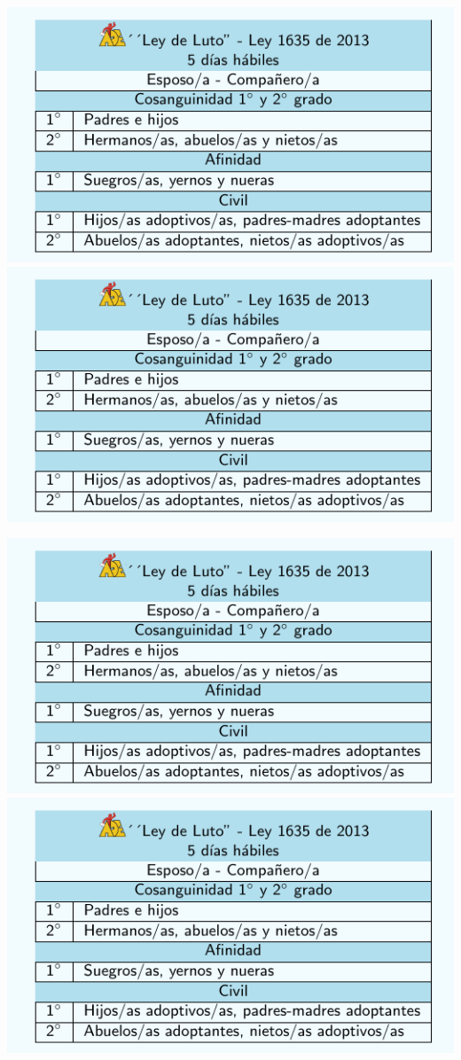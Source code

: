 \documentclass[10pt,letterpaper]{minimal}
\begin{document}
\begin{center}
\hspace{1mm}\includegraphics[scale=1]{Tarjeta2.pdf} \includegraphics[scale=1]{Tarjeta2.pdf} \vspace{1mm}

\hspace{1mm}\includegraphics[scale=1]{Tarjeta2.pdf} \includegraphics[scale=1]{Tarjeta2.pdf} \vspace{1mm}

\end{center}
\pagebreak
\end{document}
